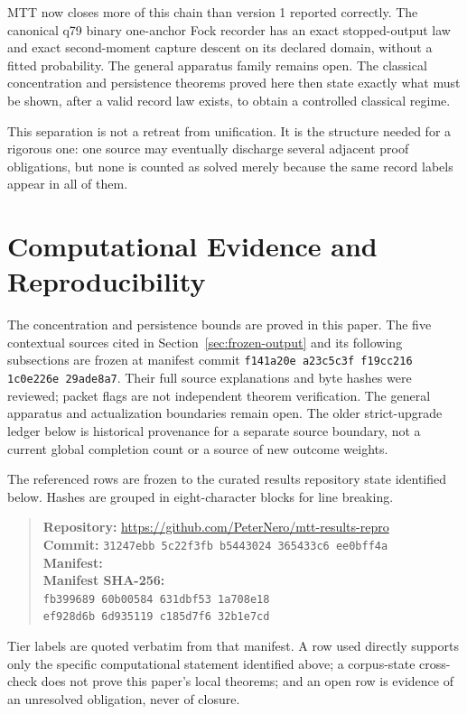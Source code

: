 \documentclass[11pt]{article}
\begin{document}
MTT now closes more of this chain than version 1 reported correctly. The
canonical q79 binary one-anchor Fock recorder has an exact stopped-output law
and exact second-moment capture descent on its declared domain, without a fitted
probability. The general apparatus family remains open. The classical
concentration and persistence theorems proved here then state exactly what must
be shown, after a valid record law exists, to obtain a controlled classical
regime.

This separation is not a retreat from unification. It is the structure needed
for a rigorous one: one source may eventually discharge several adjacent proof
obligations, but none is counted as solved merely because the same record labels
appear in all of them.

\section*{Computational Evidence and Reproducibility}
The concentration and persistence bounds are proved in this paper. The five
contextual sources cited in Section~\ref{sec:frozen-output} and its following
subsections are frozen at manifest commit
\texttt{f141a20e a23c5c3f f19cc216 1c0e226e 29ade8a7}. Their full source
explanations and byte hashes were reviewed; packet flags are not independent
theorem verification. The general apparatus and actualization boundaries
remain open. The older strict-upgrade ledger below is historical provenance
for a separate source boundary, not a current global completion count or a
source of new outcome weights.

The referenced rows are frozen to the curated results repository state identified below. Hashes are grouped in eight-character blocks for line breaking.
\begin{quote}\small
\textbf{Repository:} \url{https://github.com/PeterNero/mtt-results-repro}\\
\textbf{Commit:} \texttt{31247ebb 5c22f3fb b5443024 365433c6 ee0bff4a}\\
\textbf{Manifest:} \\
\textbf{Manifest SHA-256:}\\
\texttt{fb399689 60b00584 631dbf53 1a708e18}\\
\texttt{ef928d6b 6d935119 c185d7f6 32b1e7cd}
\end{quote}

Tier labels are quoted verbatim from that manifest. A row used directly supports only the specific computational statement identified above; a corpus-state cross-check does not prove this paper's local theorems; and an open row is evidence of an unresolved obligation, never of closure.
\end{document}
